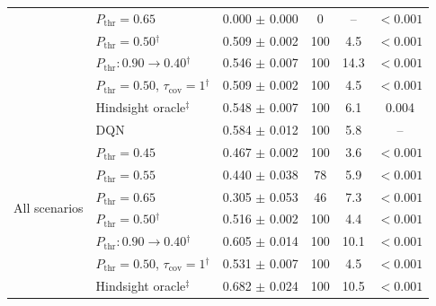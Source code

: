 \begin{table}[htbp]
\begin{tabular}{llcccc}
 & $P_{\mathrm{thr}}=0.65$ & 0.000 $\pm$ 0.000 & 0 & -- & $<0.001$ \\
 & $P_{\mathrm{thr}}=0.50$$^{\dagger}$ & 0.509 $\pm$ 0.002 & 100 & 4.5 & $<0.001$ \\
 & $P_{\mathrm{thr}}: 0.90 \to 0.40$$^{\dagger}$ & 0.546 $\pm$ 0.007 & 100 & 14.3 & $<0.001$ \\
 & $P_{\mathrm{thr}}=0.50$, $\tau_{\mathrm{cov}}=1$$^{\dagger}$ & 0.509 $\pm$ 0.002 & 100 & 4.5 & $<0.001$ \\
 & Hindsight oracle$^{\ddagger}$ & 0.548 $\pm$ 0.007 & 100 & 6.1 & 0.004 \\
\midrule
\multirow{8}{*}{All scenarios} & DQN & 0.584 $\pm$ 0.012 & 100 & 5.8 & -- \\
 & $P_{\mathrm{thr}}=0.45$ & 0.467 $\pm$ 0.002 & 100 & 3.6 & $<0.001$ \\
 & $P_{\mathrm{thr}}=0.55$ & 0.440 $\pm$ 0.038 & 78 & 5.9 & $<0.001$ \\
 & $P_{\mathrm{thr}}=0.65$ & 0.305 $\pm$ 0.053 & 46 & 7.3 & $<0.001$ \\
 & $P_{\mathrm{thr}}=0.50$$^{\dagger}$ & 0.516 $\pm$ 0.002 & 100 & 4.4 & $<0.001$ \\
 & $P_{\mathrm{thr}}: 0.90 \to 0.40$$^{\dagger}$ & 0.605 $\pm$ 0.014 & 100 & 10.1 & $<0.001$ \\
 & $P_{\mathrm{thr}}=0.50$, $\tau_{\mathrm{cov}}=1$$^{\dagger}$ & 0.531 $\pm$ 0.007 & 100 & 4.5 & $<0.001$ \\
 & Hindsight oracle$^{\ddagger}$ & 0.682 $\pm$ 0.024 & 100 & 10.5 & $<0.001$ \\
\bottomrule
\end{tabular}
\end{table}
